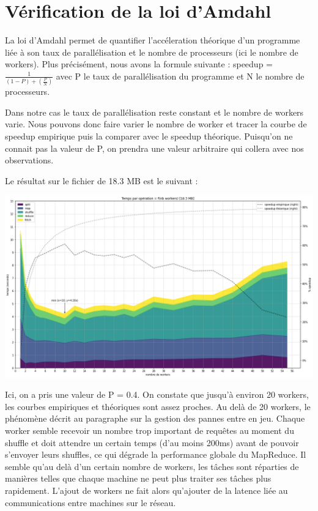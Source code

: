\documentclass[11pt,a4paper]{article}
\begin{document}
\section{Vérification de la loi d'Amdahl}
La loi d'Amdahl permet de quantifier l'accéleration théorique d'un programme liée à son taux de parallélisation et le nombre de processeurs (ici le nombre de workers). Plus précisément, nous avons la formule suivante : speedup = $\frac{1}{(1-P)+(\frac{P}{N})}$ avec P le taux de parallélisation du programme et N le nombre de processeurs.

Dans notre cas le taux de parallélisation reste constant et le nombre de workers varie. Nous pouvons donc faire varier le nombre de worker et tracer la courbe de speedup empirique puis la comparer avec le speedup théorique. Puisqu'on ne connait pas la valeur de P, on prendra une valeur arbitraire qui collera avec nos observations.

Le résultat sur le fichier de 18.3 MB est le suivant :

\includegraphics[width=\columnwidth]{graph1.png}

Ici, on a pris une valeur de P = 0.4. On constate que jusqu'à environ 20 workers, les courbes empiriques et théoriques sont assez proches. Au delà de 20 workers, le phénomène décrit au paragraphe sur la gestion des pannes entre en jeu. Chaque worker semble recevoir un nombre trop important de requêtes au moment du shuffle et doit attendre un certain temps (d'au moins 200ms) avant de pouvoir s'envoyer leurs shuffles, ce qui dégrade la performance globale du MapReduce. Il semble qu'au delà d'un certain nombre de workers, les tâches sont réparties de manières telles que chaque machine ne peut plus traiter ses tâches plus rapidement. L'ajout de workers ne fait alors qu'ajouter de la latence liée au communications entre machines sur le réseau.
\end{document}

